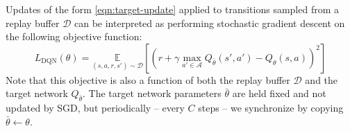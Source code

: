 \documentclass[11pt]{article}
\theoremstyle{case}
\begin{document}
Updates of the form \eqref{eqn:target-update} applied to transitions sampled from a replay buffer $\mathcal{D}$ can be interpreted as performing stochastic gradient descent on the following objective function: 
\begin{equation}
L_{\text{DQN}}(\theta) = \underset{(s,a,r,s') \sim \mathcal{D}}{\mathbb{E}}\left[\left(r+\gamma \max_{a' \in \mathcal{A}}Q_{\bar{\theta}}(s', a') - Q_{\theta}(s, a)\right)^2\right] \label{eqn:brm}
\end{equation}
Note that this objective is also a function of both the replay buffer $\mathcal{D}$ and the target network $Q_{\bar{\theta}}$.
The target network parameters $\bar{\theta}$ are held fixed and not updated by SGD, but periodically -- every $C$ steps -- we synchronize by copying $\bar{\theta} \leftarrow \theta$.
\end{document}
